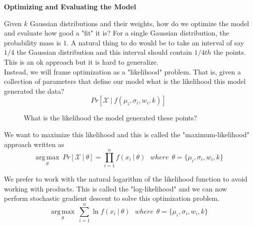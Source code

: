 \documentclass[english,course]{Notes}
\begin{document}
\textbf{Optimizing and Evaluating the Model}

Given $k$ Gaussian distributions and their weights, how do we optimize the model and evaluate how good a "fit" it is? For a single Gaussian distribution, the probability mass is $1$. A natural thing to do would be to take an interval of say $1/4$ the Gaussian distribution and this interval should contain $1/4th$ the points. This is an ok approach but it is hard to generalize. \\

Instead, we will frame optimization as a "likelihood" problem. That is, given a collection of parameters that define our model what is the likelihood this model generated the data?
\begin{equation}
\label{eq:transition1}
Pr[\mathcal{X} \ \vert \ f(\mu_i, \sigma_i, w_i, k)]
\end{equation}

\begin{figure}[H]
\centering
{}
\caption{What is the likelihood the model generated these points?} \label{fig:M1}
\end{figure}

We want to maximize this likelihood and this is called the "maximum-likelihood" approach written as 
\begin{equation}
\label{eq:transition1}
\operatorname*{arg\,max}_\theta \ Pr[\mathcal{X} \ \vert \ \theta] = \prod_{i = 1}^n f(x_i \ \vert \ \theta) \ \ \ where \ \    \theta = \{\mu_i, \sigma_i, w_i, k\}
\end{equation}

We prefer to work with the natural logarithm of the likelihood function to avoid working with products. This is called the "log-likelihood" and we can now perform stochastic gradient descent to solve this optimization problem.
\begin{equation}
\label{eq:transition1}
\operatorname*{arg\,max}_\theta \ \sum_{i = 1}^n \ln f(x_i \ \vert \ \theta) \ \ \ where \ \    \theta = \{\mu_i, \sigma_i, w_i, k\}
\end{equation}
\end{document}
